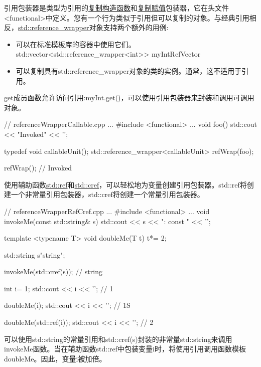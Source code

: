 引用包装器是类型为引用的\href{http://en.cppreference.com/w/cpp/concept/CopyConstructible}{复制构造函数}和\href{http://en.cppreference.com/w/cpp/concept/CopyAssignable}{复制赋值}包装器，它在头文件<functional>中定义。您有一个行为类似于引用但可以复制的对象。与经典引用相反，\href{http://en.cppreference.com/w/cpp/utility/functional/reference_wrapper}{std::reference\_wrapper}对象支持两个额外的用例:

\begin{itemize}
\item 
可以在标准模板库的容器中使用它们。std::vector<std::reference\_wrapper<int>{}> myIntRefVector

\item 
可以复制具有std::reference\_wrapper对象的类的实例。通常，这不适用于引用。
\end{itemize}

get成员函数允许访问引用:myInt.get()，可以使用引用包装器来封装和调用可调用对象。


\begin{cpp}
// referenceWrapperCallable.cpp
...
#include <functional>
...
void foo(){
	std::cout << "Invoked" << '\n';
}

typedef void callableUnit();
std::reference_wrapper<callableUnit> refWrap(foo);

refWrap(); // Invoked
\end{cpp}


使用辅助函数\href{http://en.cppreference.com/w/cpp/utility/functional/ref}{std::ref}和\href{http://en.cppreference.com/w/cpp/utility/functional/ref}{std::cref}，可以轻松地为变量创建引用包装器。std::ref将创建一个非常量引用包装器，std::cref将创建一个常量引用包装器。


\begin{cpp}
// referenceWrapperRefCref.cpp
...
#include <functional>
...
void invokeMe(const std::string& s){
	std::cout << s << ": const " << '\n';
}

template <typename T>
void doubleMe(T t){
	t*= 2;
}

std::string s{"string"};

invokeMe(std::cref(s)); // string

int i= 1;
std::cout << i << '\n'; // 1

doubleMe(i);
std::cout << i << '\n'; // 1S

doubleMe(std::ref(i));
std::cout << i << '\n'; // 2
\end{cpp}

可以使用std::string的常量引用和std::cref(s)封装的非常量std::string来调用invokeMe函数。当在辅助函数std::ref中包装变量i时，将使用引用调用函数模板doubleMe。因此，变量i被加倍。


































